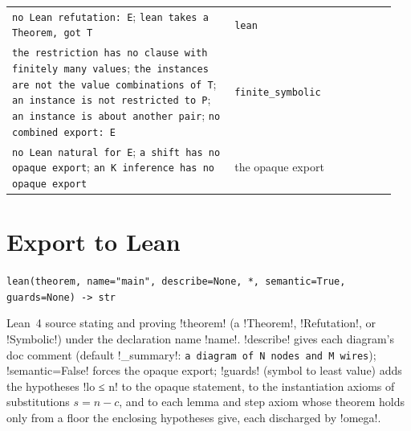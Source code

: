 \begin{small}
\begin{longtable}{@{}>{\raggedright\arraybackslash}p{0.55\linewidth}>{\raggedright\arraybackslash}p{0.4\linewidth}@{}}
\texttt{no Lean refutation: E}; \texttt{lean takes a Theorem, got T} & \texttt{lean} \\
\texttt{the restriction has no clause with finitely many values}; \texttt{the instances are not the value combinations of T}; \texttt{an instance is not restricted to P}; \texttt{an instance is about another pair}; \texttt{no combined export: E} & \texttt{finite\_symbolic} \\
\texttt{no Lean natural for E}; \texttt{a shift has no opaque export}; \texttt{an K inference has no opaque export} & the opaque export \\
\end{longtable}
\end{small}

\section{Export to Lean}\label{sec:kernel-lean}

\begin{signature}
\texttt{lean(\allowbreak{}theorem,\allowbreak{} name="main",\allowbreak{} describe=None,\allowbreak{} *,\allowbreak{} semantic=True,\allowbreak{} guards=None) -> str}

Lean~4 source stating and proving \code!theorem! (a \py!Theorem!, \py!Refutation!, or \py!Symbolic!) under the declaration name \code!name!. \code!describe! gives each diagram's doc comment (default \py!_summary!: \texttt{a diagram of N nodes and M wires}); \code!semantic=False! forces the opaque export; \code!guards! (symbol to least value) adds the hypotheses \code!lo ≤ n! to the opaque statement, to the instantiation axioms of substitutions $s=n-c$, and to each lemma and step axiom whose theorem holds only from a floor the enclosing hypotheses give, each discharged by \lean!omega!.
\end{signature}

